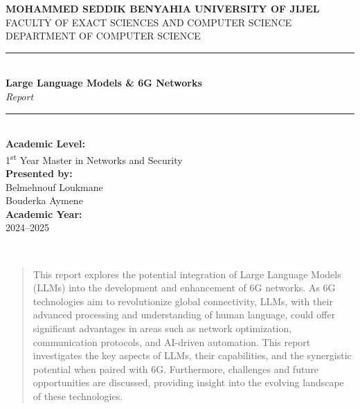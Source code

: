 \documentclass[12pt]{article}
\begin{document}
\thispagestyle{empty}
\begin{center}
    \textbf{\LARGE MOHAMMED SEDDIK BENYAHIA UNIVERSITY OF JIJEL}\\[0.5em]
    \Large FACULTY OF EXACT SCIENCES AND COMPUTER SCIENCE\\[0.5em]
    \Large DEPARTMENT OF COMPUTER SCIENCE\\[2em]

    \rule{\linewidth}{0.5mm}\\[1em]
    {\Huge \textbf{Large Language Models \& 6G Networks}}\\[0.5em]
    {\Large \textit{Report}}\\[0.8em]
    \rule{\linewidth}{0.5mm}\\[3em]

    \Large \textbf{Academic Level:}\\
    1\textsuperscript{st} Year Master in Networks and Security\\[3em]

    \Large \textbf{Presented by:}\\[0.5em]
    Belmehnouf Loukmane\\
    Bouderka Aymene\\[3em]

    \Large \textbf{Academic Year:}\\
    2024–2025
\end{center}

\newpage
\thispagestyle{empty}
~
\newpage

\newpage
\begin{abstract}
    This report explores the potential integration of Large Language Models (LLMs) into the development and enhancement of 6G networks. As 6G technologies aim to revolutionize global connectivity, LLMs, with their advanced processing and understanding of human language, could offer significant advantages in areas such as network optimization, communication protocols, and AI-driven automation. This report investigates the key aspects of LLMs, their capabilities, and the synergistic potential when paired with 6G. Furthermore, challenges and future opportunities are discussed, providing insight into the evolving landscape of these technologies.
\end{abstract}

\newpage
\tableofcontents
\newpage

\end{document}

